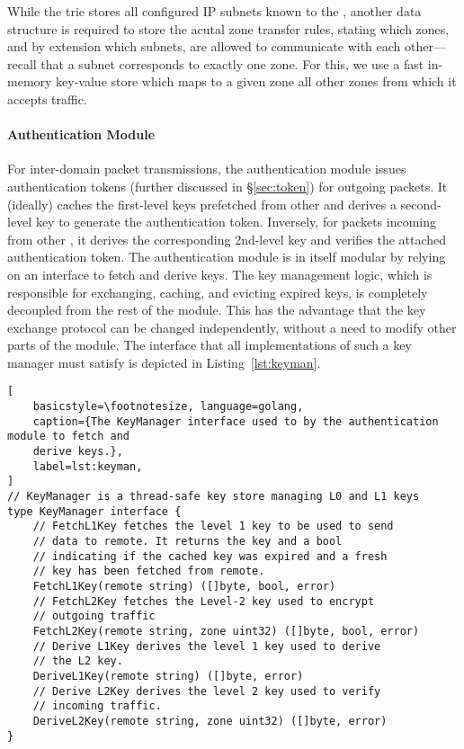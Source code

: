 While the trie stores all configured IP subnets known to the \tp, another data structure is required
to store the acutal zone transfer rules, stating which zones, and by extension which subnets, are
allowed to communicate with each other---recall that a subnet corresponds to exactly one zone. For this,
we use a fast in-memory key-value store which maps to a given zone all other zones from which it
accepts traffic.

\paragraph{Authentication Module}
For inter-domain packet transmissions, the authentication module issues
authentication tokens (further discussed in \S\ref{sec:token}) for outgoing packets.
It (ideally) caches the first-level keys prefetched
from other \tps and derives a second-level key to generate the authentication token. Inversely, for
packets incoming from other \tps, it derives the corresponding 2nd-level key
and verifies the attached authentication token. The authentication module is in itself modular by
relying on an interface to fetch and derive keys. The key management logic, which is
responsible for exchanging, caching, and evicting expired keys, is completely
decoupled from the rest of the module. This has the advantage that the key exchange protocol can be changed
independently, without a need to modify other parts of the module. The interface that all
implementations of such a key manager must satisfy is depicted in Listing~\ref{lst:keyman}.

\begin{minipage}{\linewidth}
	\begin{lstlisting}[
	basicstyle=\footnotesize, language=golang,
	caption={The KeyManager interface used to by the authentication module to fetch and
	derive keys.},
	label=lst:keyman,
]
// KeyManager is a thread-safe key store managing L0 and L1 keys
type KeyManager interface {
	// FetchL1Key fetches the level 1 key to be used to send
	// data to remote. It returns the key and a bool
	// indicating if the cached key was expired and a fresh
	// key has been fetched from remote.
	FetchL1Key(remote string) ([]byte, bool, error)
	// FetchL2Key fetches the Level-2 key used to encrypt
	// outgoing traffic
	FetchL2Key(remote string, zone uint32) ([]byte, bool, error)
	// Derive L1Key derives the level 1 key used to derive
	// the L2 key.
	DeriveL1Key(remote string) ([]byte, error)
	// Derive L2Key derives the level 2 key used to verify
	// incoming traffic.
	DeriveL2Key(remote string, zone uint32) ([]byte, error)
}
	\end{lstlisting}
\end{minipage}

